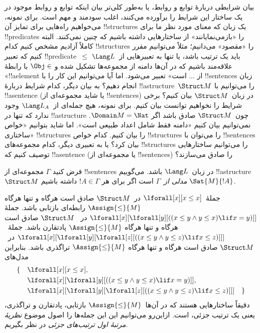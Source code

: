 \documentclass[../../../include/open-logic-section]{subfiles}
\begin{document}


\begin{explain}
بیان شرایطی دربارهٔ توابع و روابط، یا به‌طور کلی‌تر بیان اینکه توابع و
روابط موجود در یک ساختار این شرایط را برآورده می‌کنند، اغلب سودمند و
مهم است. برای نمونه، می‌خواهیم راه‌هایی برای تمایز آن !!{structure}s
یک زبان که معنای مورد نظر ما برای !!{predicate}s را «بازمی‌نمایانند»
از ساختارهایی داشته باشیم که چنین نمی‌کنند. البته کاملاً آزادیم مشخص
کنیم کدام !!{structure}s را «مقصود» می‌دانیم؛ مثلاً می‌توانیم مقرر کنیم
که تعبیر !!{predicate}~$\le$ باید یک ترتیب باشد، یا تنها به تعبیرهایی
از~$\Lang L$ علاقه‌مند باشیم که در آن‌ها دامنه از مجموعه‌ها تشکیل شده و
$\Obj \in$ با رابطهٔ «!!a{element} از ... است» تعبیر می‌شود. اما آیا می‌توانیم این
کار را با !!{sentence}s زبان انجام دهیم؟ به بیان دیگر، کدام شرایط دربارهٔ
!!a{structure}~$\Struct M$ را می‌توانیم با !!a{sentence} (یا شاید
مجموعه‌ای از !!{sentence}s) در زبان~$\Struct M$ بیان کنیم؟ برخی شرایط را
نخواهیم توانست بیان کنیم. برای نمونه، هیچ جمله‌ای از~$\Lang L_A$
وجود ندارد که تنها در !!a{structure} چون~$\Struct M$ صادق باشد اگر
$\Domain M = \Nat$. نمی‌توانیم بیان کنیم «دامنه فقط شامل اعداد طبیعی
است». اما شاید بتوانیم «خواص ساختاری» !!{structure}s را بیان کنیم. کدام
خواص !!{structure}s را می‌توان با !!{sentence}s بیان کرد؟ یا به تعبیری
دیگر، کدام مجموعه‌های !!{structure}s را می‌توانیم ساختارهایی توصیف کنیم
که !!a{sentence} (یا مجموعه‌ای از !!{sentence}s) را صادق می‌سازند؟
\end{explain}

\begin{defn}
فرض کنید $\Gamma$ مجموعه‌ای از !!{sentence}s در زبان~$\Lang L$ باشد.
می‌گوییم !!a{structure}~$\Struct M$ \emph{مدلی از}~$\Gamma$ است اگر برای
هر $!A \in \Gamma$ داشته باشیم $\Sat{M}{!A}$.
\end{defn}

\begin{ex}
جملهٔ~$\lforall[x][x \le x]$ در~$\Struct M$ صادق است هرگاه و تنها
هرگاه $\Assign{\le}{M}$ رابطه‌ای بازتابی باشد. جملهٔ
$\lforall[x][\lforall[y][((x \le y \land y \le x) \lif x = y)]]$ در
~$\Struct M$ صادق است هرگاه و تنها هرگاه $\Assign{\le}{M}$ پادتقارن
باشد. جملهٔ~$\lforall[x][\lforall[y][\lforall[z][((x \le y \land y \le z)
      \lif x \le z)]]]$ در~$\Struct M$ صادق است هرگاه و تنها هرگاه
$\Assign{\le}{M}$ تراگذری باشد. بنابراین مدل‌های
\begin{align*}
\{\quad &\lforall[x][x \le x], \\
   & \lforall[x][\lforall[y][((x \le y \land y \le
    x) \lif x = y)]], \\
   &\lforall[x][\lforall[y][\lforall[z][((x \le y
      \land y \le z) \lif x \le z)]]] \quad \}
\end{align*}
دقیقاً ساختارهایی هستند که در آن‌ها~$\Assign{\le}{M}$ بازتابی،
پادتقارن و تراگذری، یعنی یک ترتیب جزئی، است. ازاین‌رو می‌توانیم این
این جمله‌ها را اصول موضوع \emph{نظریهٔ مرتبهٔ اول ترتیب‌های جزئی}
در نظر بگیریم.
\end{ex}
\end{document}
